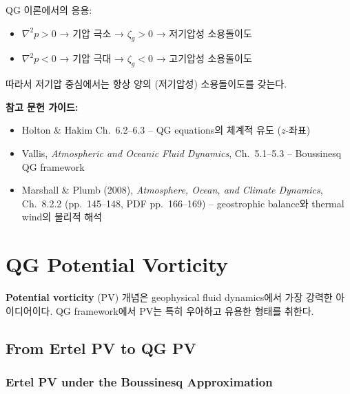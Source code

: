 
\begin{hisublock}
QG 이론에서의 응용:
\begin{itemize}
  \item $\nabla^2 p > 0$ → 기압 극소 → $\zeta_g > 0$ → 저기압성 소용돌이도
  \item $\nabla^2 p < 0$ → 기압 극대 → $\zeta_g < 0$ → 고기압성 소용돌이도
\end{itemize}
따라서 저기압 중심에서는 항상 양의 (저기압성) 소용돌이도를 갖는다.
\end{hisublock}

\begin{hisublock}
\textbf{참고 문헌 가이드:}
\begin{itemize}
  \item Holton \& Hakim Ch.~6.2--6.3 -- QG equations의 체계적 유도 ($z$-좌표)
  \item Vallis, \textit{Atmospheric and Oceanic Fluid Dynamics}, Ch.~5.1--5.3 -- Boussinesq QG framework
  \item Marshall \& Plumb (2008), \textit{Atmosphere, Ocean, and Climate Dynamics}, Ch.~8.2.2 (pp.~145--148, PDF pp.~166--169) -- geostrophic balance와 thermal wind의 물리적 해석
\end{itemize}
\end{hisublock}


\section{QG Potential Vorticity}\label{sec:qgpv}

\textbf{Potential vorticity} (PV) 개념은 geophysical fluid dynamics에서
가장 강력한 아이디어이다.  QG framework에서 PV는
특히 우아하고 유용한 형태를 취한다.

\subsection{From Ertel PV to QG PV}\label{subsec:ertel-to-qg}

\subsubsection{Ertel PV under the Boussinesq Approximation}

